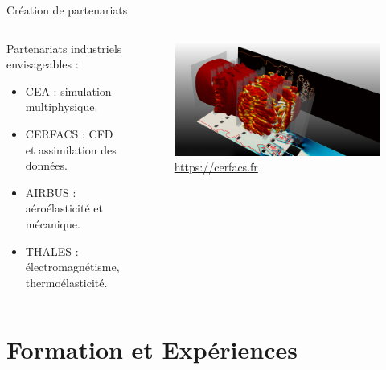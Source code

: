 \documentclass[aspectratio=169, french]{beamer}
\begin{document}
\begin{frame}{Création de partenariats}	

	\begin{columns}
		\begin{column}{.5\textwidth}
			Partenariats industriels envisageables : 
			\begin{itemize}
				\item CEA : simulation multiphysique.
				\item CERFACS : CFD et assimilation des données. 
				\item AIRBUS : aéroélasticité et mécanique.
				\item THALES : électromagnétisme, thermoélasticité.
			\end{itemize}
		\end{column}
		\begin{column}{.43\textwidth}
			\begin{figure}
				\includegraphics[width=1\textwidth]{image_CERFACS.png}
				\caption{\href{https://cerfacs.fr/logiciels-de-simulation-pour-la-mecanique-des-fluides/}{https://cerfacs.fr}}
			\end{figure}	
		\end{column}
	\end{columns}
	
\end{frame}




\begin{frame}{}

\end{frame}

\appendix

\section{Formation et Expériences}
\end{document}

